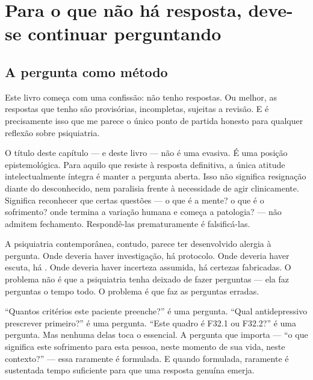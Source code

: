 \chapter{Para o que não há resposta, deve-se continuar perguntando}
\label{ch:pergunta}

\section{A pergunta como método}
\label{sec:pergunta-metodo}

Este livro começa com uma confissão: não tenho respostas. Ou melhor, as respostas que tenho são provisórias, incompletas, sujeitas a revisão. E é precisamente isso que me parece o único ponto de partida honesto para qualquer reflexão sobre psiquiatria.

O título deste capítulo --- e deste livro --- não é uma evasiva. É uma posição epistemológica. Para aquilo que resiste à resposta definitiva, a única atitude intelectualmente íntegra é manter a pergunta aberta. Isso não significa resignação diante do desconhecido, nem paralisia frente à necessidade de agir clinicamente. Significa reconhecer que certas questões --- o que é a mente? o que é o sofrimento? onde termina a variação humana e começa a patologia? --- não admitem fechamento. Respondê-las prematuramente é falsificá-las.

A psiquiatria contemporânea, contudo, parece ter desenvolvido alergia à pergunta. Onde deveria haver investigação, há protocolo. Onde deveria haver escuta, há . Onde deveria haver incerteza assumida, há certezas fabricadas. O problema não é que a psiquiatria tenha deixado de fazer perguntas --- ela faz perguntas o tempo todo. O problema é que faz as perguntas erradas.

\enquote{Quantos critérios este paciente preenche?} é uma pergunta. \enquote{Qual antidepressivo prescrever primeiro?} é uma pergunta. \enquote{Este quadro é F32.1 ou F32.2?} é uma pergunta. Mas nenhuma delas toca o essencial. A pergunta que importa --- \enquote{o que significa este sofrimento para esta pessoa, neste momento de sua vida, neste contexto?} --- essa raramente é formulada. E quando formulada, raramente é sustentada tempo suficiente para que uma resposta genuína emerja.

